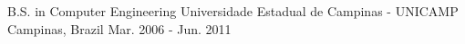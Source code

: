 

\begin{cventries}

  \cventry
    {B.S. in Computer Engineering} %
    {Universidade Estadual de Campinas - UNICAMP} %
    {Campinas, Brazil} %
    {Mar. 2006 - Jun. 2011} %
    {
    }

\end{cventries}
